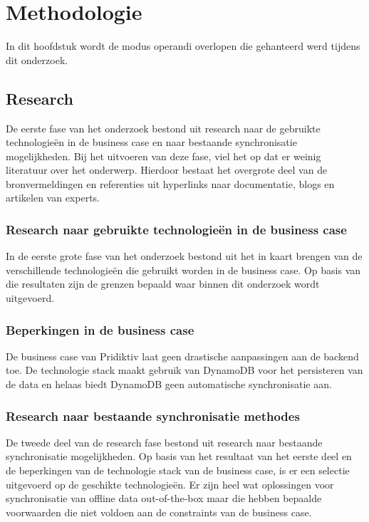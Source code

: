 
\chapter{Methodologie}
\label{ch:methodologie}
In dit hoofdstuk wordt de modus operandi overlopen die gehanteerd werd tijdens dit onderzoek.
\section{Research}
De eerste fase van het onderzoek bestond uit research naar de gebruikte technologie\"en in de business case en naar bestaande synchronisatie mogelijkheden. Bij het uitvoeren van deze fase, viel het op dat er weinig literatuur over het onderwerp. Hierdoor bestaat het overgrote deel van de bronvermeldingen en referenties uit hyperlinks naar documentatie, blogs en artikelen van experts.
\subsection{Research naar gebruikte technologie\"en in de business case}
In de eerste grote fase van het onderzoek bestond uit het in kaart brengen van de verschillende technologie\"en die gebruikt worden in de business case. Op basis van die resultaten zijn de grenzen bepaald waar binnen dit onderzoek wordt uitgevoerd.
\subsection{Beperkingen in de business case}
\label{subsec:beperkingen-business-case}
De business case van Pridiktiv laat geen drastische aanpassingen aan de backend toe. De technologie stack maakt gebruik van DynamoDB voor het persisteren van de data en helaas biedt DynamoDB geen automatische synchronisatie aan. 
\subsection{Research naar bestaande synchronisatie methodes}
De tweede deel van de research fase bestond uit research naar bestaande synchronisatie mogelijkheden. Op basis van het resultaat van het eerste deel en de beperkingen van de technologie stack van de business case, is er een selectie uitgevoerd op de geschikte technologie\"en. Er zijn heel wat oplossingen voor synchronisatie van offline data out-of-the-box maar die hebben bepaalde voorwaarden die niet voldoen aan de constraints van de business case.
